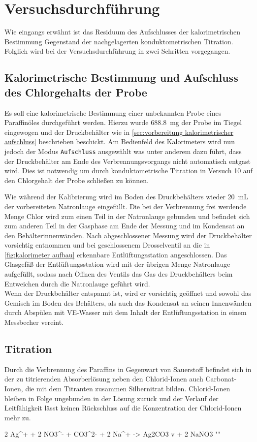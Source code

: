 \chapter{Versuchsdurchführung}
	Wie eingangs erwähnt ist das Residuum des Aufschlusses der kalorimetrischen Bestimmung Gegenstand der nachgelagerten konduktometrischen Titration.
	Folglich wird bei der Versuchsdurchführung in zwei Schritten vorgegangen.
	\section{Kalorimetrische Bestimmung und Aufschluss des Chlorgehalts der Probe}
		Es soll eine kalorimetrische Bestimmung einer unbekannten Probe eines Paraffinöles durchgeführt werden. Hierzu wurde \SI{688,8}{mg} der Probe
		im Tiegel eingewogen und der Druckbehälter wie in \cref{sec:vorbereitung kalorimetrischer aufschluss} beschrieben beschickt. Am Bedienfeld
		des Kalorimeters wird nun jedoch der Modus \texttt{Aufschluss} ausgewählt was unter anderem dazu führt, dass der Druckbehälter am Ende
		des Verbrennungsvorgangs nicht automatisch entgast wird. Dies ist notwendig um durch konduktometrische Titration in Versuch 10
		auf den Chlorgehalt der Probe schließen zu können.\par
		Wie während der Kalibrierung wird im Boden des Druckbehälters wieder \SI{20}{mL} der vorbereiteten Natronlauge eingefüllt. Die bei der Verbrennung frei werdende
		Menge Chlor wird zum einen Teil in der Natronlauge gebunden und befindet sich zum anderen Teil in der Gasphase am Ende der Messung und im
		Kondensat an den Behälterinnenwänden. Nach abgeschlossener Messung wird der Druckbehälter vorsichtig entnommen und bei geschlossenem
		Drosselventil an die in \cref{fig:kalorimeter aufbau} erkennbare Entlüftungsstation angeschlossen. Das Glasgefäß der Entlüftungsstation wird
		mit der übrigen Menge Natronlauge aufgefüllt, sodass nach Öffnen des Ventils das Gas des Druckbehälters beim Entweichen durch
		die Natronlauge geführt wird.\\
		Wenn der Druckbehälter entspannt ist, wird er vorsichtig geöffnet und sowohl das Gemisch im Boden des Behälters, als auch das Kondensat an
		seinen Innenwänden durch Abspülen mit VE-Wasser mit dem Inhalt der Entlüftungsstation in einem Messbecher vereint.
	\section{Titration}\label{sec:titration}
		Durch die Verbrennung des Paraffins in Gegenwart von Sauerstoff befindet sich in der zu titrierenden Absorberlösung neben den Chlorid-Ionen
		auch Carbonat-Ionen, die mit dem Titranten zusammen Silbernitrat bilden. Chlorid-Ionen bleiben in Folge ungebunden in der Lösung zurück
		und der Verlauf der Leitfähigkeit lässt keinen Rückschluss auf die Konzentration der Chlorid-Ionen mehr zu.
		\begin{reaction}
			2 Ag^+ + 2 NO3^- + CO3^{2-} + 2 Na^+ -> Ag2CO3 v + 2 NaNO3 "\label{re:silbercarbonat bildung}"
		\end{reaction}

